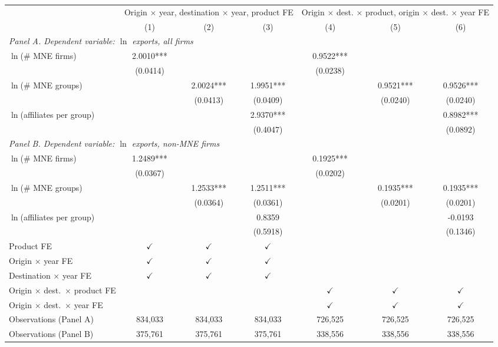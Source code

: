 \begin{tabular}{lcccccc} \hline
 & \multicolumn{3}{c}{Origin $\times$ year, destination $\times$ year, product FE} & \multicolumn{3}{c}{Origin $\times$ dest. $\times$ product, origin $\times$ dest. $\times$ year FE} \\
 & (1) & (2) & (3) & (4) & (5) & (6) \\ \hline
\multicolumn{7}{l}{\textit{Panel A. Dependent variable: $\ln$ exports, all firms}} \\
$\ln$(\# MNE firms) & 2.0010*** &  &  & 0.9522*** &  &  \\
 & (0.0414) &  &  & (0.0238) &  &  \\
$\ln$(\# MNE groups) &  & 2.0024*** & 1.9951*** &  & 0.9521*** & 0.9526*** \\
 &  & (0.0413) & (0.0409) &  & (0.0240) & (0.0240) \\
$\ln$(affiliates per group) &  &  & 2.9370*** &  &  & 0.8982*** \\
 &  &  & (0.4047) &  &  & (0.0892) \\
\midrule
\multicolumn{7}{l}{\textit{Panel B. Dependent variable: $\ln$ exports, non-MNE firms}} \\
$\ln$(\# MNE firms) & 1.2489*** &  &  & 0.1925*** &  &  \\
 & (0.0367) &  &  & (0.0202) &  &  \\
$\ln$(\# MNE groups) &  & 1.2533*** & 1.2511*** &  & 0.1935*** & 0.1935*** \\
 &  & (0.0364) & (0.0361) &  & (0.0201) & (0.0201) \\
$\ln$(affiliates per group) &  &  & 0.8359 &  &  & -0.0193 \\
 &  &  & (0.5918) &  &  & (0.1346) \\
\hline
Product FE & $\checkmark$ & $\checkmark$ & $\checkmark$ &  &  &  \\
Origin $\times$ year FE & $\checkmark$ & $\checkmark$ & $\checkmark$ &  &  &  \\
Destination $\times$ year FE & $\checkmark$ & $\checkmark$ & $\checkmark$ &  &  &  \\
Origin $\times$ dest.\ $\times$ product FE &  &  &  & $\checkmark$ & $\checkmark$ & $\checkmark$ \\
Origin $\times$ dest.\ $\times$ year FE &  &  &  & $\checkmark$ & $\checkmark$ & $\checkmark$ \\
Observations (Panel A) & 834,033 & 834,033 & 834,033 & 726,525 & 726,525 & 726,525 \\
Observations (Panel B) & 375,761 & 375,761 & 375,761 & 338,556 & 338,556 & 338,556 \\
\hline
\end{tabular}
